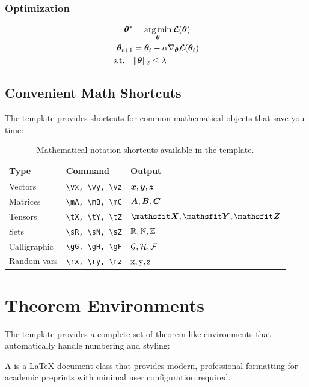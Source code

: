 \documentclass{triton}
\begin{document}
\subsubsection{Optimization}
\begin{align}
{\bm{\theta}}^* &= \operatorname*{arg\,min}_{{\bm{\theta}}} \mathcal{L}({\bm{\theta}}) \\
{\bm{\theta}}_{t+1} &= {\bm{\theta}}_t - \alpha \nabla_{{\bm{\theta}}} \mathcal{L}({\bm{\theta}}_t) \\
\text{s.t.} \quad &\|{\bm{\theta}}\|_2 \leq \lambda
\end{align}

\subsection{Convenient Math Shortcuts}

The template provides shortcuts for common mathematical objects that save you time:

\begin{table}[htbp]
\centering
\begin{tabular}{@{}lll@{}}
\toprule
\textbf{Type} & \textbf{Command} & \textbf{Output} \\
\midrule
Vectors & \verb|\vx, \vy, \vz| & ${\bm{x}}, {\bm{y}}, {\bm{z}}$ \\
Matrices & \verb|\mA, \mB, \mC| & ${\bm{A}}, {\bm{B}}, {\bm{C}}$ \\
Tensors & \verb|\tX, \tY, \tZ| & $\tX, \tY, \tZ$ \\
Sets & \verb|\sR, \sN, \sZ| & ${\mathbb{R}}, {\mathbb{N}}, {\mathbb{Z}}$ \\
Calligraphic & \verb|\gG, \gH, \gF| & ${\mathcal{G}}, {\mathcal{H}}, {\mathcal{F}}$ \\
Random vars & \verb|\rx, \ry, \rz| & ${\textnormal{x}}, {\textnormal{y}}, {\textnormal{z}}$ \\
\bottomrule
\end{tabular}
\caption{Mathematical notation shortcuts available in the template.}
\end{table}

\section{Theorem Environments}

The template provides a complete set of theorem-like environments that automatically handle numbering and styling:

\begin{definition}
A  is a \LaTeX{} document class that provides modern, professional formatting for academic preprints with minimal user configuration required.
\end{definition}
\end{document}
